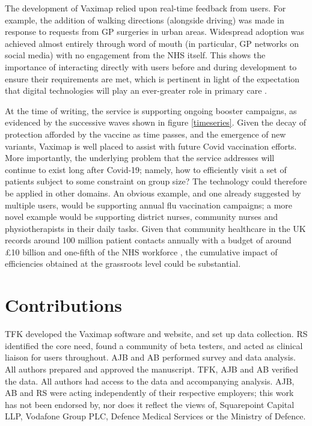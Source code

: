 \documentclass{article}
\def\vm{Vaximap}
\begin{document}
The development of \vm{} relied upon real-time feedback from users. For example, the addition of walking directions (alongside driving) was made in response to requests from GP surgeries in urban areas. Widespread adoption was achieved almost entirely through word of mouth (in particular, GP networks on social media) with no engagement from the NHS itself. This shows the importance of interacting directly with users before and during development to ensure their requirements are met, which is pertinent in light of the expectation that digital technologies will play an ever-greater role in primary care \cite{WorldHealthOrganizationWHO2018}. 

At the time of writing, the service is supporting ongoing booster campaigns, as evidenced by the successive waves shown in figure \ref{timeseries}. Given the decay of protection afforded by the vaccine as time passes, and the emergence of new variants, \vm{} is well placed to assist with future Covid vaccination efforts. More importantly, the underlying problem that the service addresses will continue to exist long after Covid-19; namely, how to efficiently visit a set of patients subject to some constraint on group size? The technology could therefore be applied in other domains. An obvious example, and one already suggested by multiple users, would be supporting annual flu vaccination campaigns; a more novel example would be supporting district nurses, community nurses and physiotherapists in their daily tasks. Given that community healthcare in the UK records around 100 million patient contacts annually with a budget of around £10 billion and one-fifth of the NHS workforce \cite{Fund2019}, the cumulative impact of efficiencies obtained at the grassroots level could be substantial. 

\section{Contributions}

TFK developed the \vm{} software and website, and set up data collection. RS identified the core need, found a community of beta testers, and acted as clinical liaison for users throughout. AJB and AB performed survey and data analysis. All authors prepared and approved the manuscript. TFK, AJB and AB verified the data. All authors had access to the data and accompanying analysis. AJB, AB and RS were acting independently of their respective employers; this work has not been endorsed by, nor does it reflect the views of, Squarepoint Capital LLP, Vodafone Group PLC, Defence Medical Services or the Ministry of Defence. 
\end{document}
